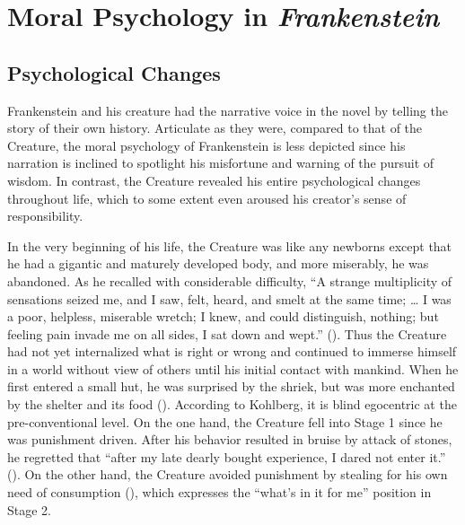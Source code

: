 \newcommand\citeflkst[2][p]{(\citec{cflksten}{Shelley, 2013:#2})}
\section{Moral Psychology in \textit{Frankenstein}} %
\label{sec:moral_psychology_in_frankenstein}
\secspacesubsec
\subsection{Psychological Changes} %
\label{sub:psychological_changes}
\begin{text}

Frankenstein and his creature had the narrative voice in the novel by telling the story of their own history. Articulate as they were, compared to that of the Creature, the moral psychology of Frankenstein is less depicted since his narration is inclined to spotlight his misfortune and warning of the pursuit of wisdom. In contrast, the Creature revealed his entire psychological changes throughout life, which to some extent even aroused his creator's sense of responsibility.

In the very beginning of his life, the Creature was like any newborns except that he had a gigantic and maturely developed body, and more miserably, he was abandoned. As he recalled with considerable difficulty, ``A strange multiplicity of sensations seized me, and I saw, felt, heard, and smelt at the same time; \dots{} I was a poor, helpless, miserable wretch; I knew, and could distinguish, nothing; but feeling pain invade me on all sides, I sat down and wept.'' \citeflkst[pp]{150--152}. Thus the Creature had not yet internalized what is right or wrong and continued to immerse himself in a world without view of others until his initial contact with mankind. When he first entered a small hut, he was surprised by the shriek, but was more enchanted by the shelter and its food \citeflkst[pp]{156--157}. According to Kohlberg, it is blind egocentric at the pre-conventional level. On the one hand, the Creature fell into Stage 1 since he was punishment driven. After his behavior resulted in bruise by attack of stones, he regretted that ``after my late dearly bought experience, I dared not enter it.'' \citeflkst{157}. On the other hand, the Creature avoided punishment by stealing for his own need of consumption \citeflkst{166}, which expresses the ``what's in it for me'' position in Stage 2.


\end{text}
